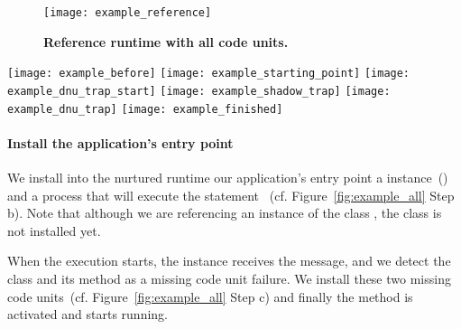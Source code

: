 \begin{figure}[ht]
\begin{center}
\texttt{[image: example\_reference]}
\caption{\small\textbf{Reference runtime with all code units.}\label{fig:example_reference}}
\end{center}
\end{figure}


\begin{figure*}[ht]
\begin{center}
\texttt{[image: example\_before]}
\texttt{[image: example\_starting\_point]}
\texttt{[image: example\_dnu\_trap\_start]}
\texttt{[image: example\_shadow\_trap]}
\texttt{[image: example\_dnu\_trap]}
\texttt{[image: example\_finished]}
\caption{\small\textbf{The nurtured runtime at different steps of tailoring.} \label{fig:example_all}}
\end{center}
\end{figure*}

\paragraph{Install the application's entry point} We install into the nurtured runtime our application's entry point \ie a  instance~() and a process that will execute the statement ~(cf. Figure~\ref{fig:example_all} Step b). Note that although we are referencing an instance of the class , the  class is not installed yet.


When the execution starts, the  instance receives the  message, and we detect the  class and its  method as a missing code unit failure. We install these two missing code units~(cf. Figure~\ref{fig:example_all} Step c) and finally the  method is activated and starts running.


